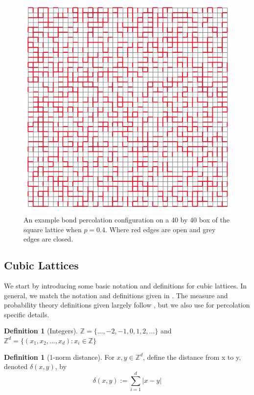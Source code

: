 \documentclass[a4paper,11pt]{article}
\theoremstyle{definition}
\newtheorem{definition}[theorem]{Definition}
\begin{document}
\begin{figure}
	\centering
	\includegraphics[scale=0.7]{drawings/simulationConfig.png}
	\caption{An example bond percolation configuration on a 40 by 40 box of the square lattice when $p=0.4$. Where red edges are open and grey edges are closed.}
	\label{fig:simBox}
\end{figure}
\subsection{Cubic Lattices}

We start by introducing some basic notation and definitions for cubic lattices. In general, we match the notation and definitions given in \cite{steif2011mini}. The measure and probability theory definitions given largely follow \cite{ash2000probability}, but we also use \cite{bollo2006} for percolation specific details.

\begin{definition}[Integers]\label{ints} 
	$\mathbb{Z} = \{...,-2,-1,0,1,2,...\}$ and $\mathbb{Z}^d = \{(x_1,x_2,...,x_d) : x_i \in \mathbb{Z} \}$
\end{definition}

\begin{definition}[1-norm distance]\label{dist}
	For $x,y\in \mathbb{Z}^d$, define the distance from x to y, denoted $\delta(x,y)$, by
	$$\delta(x,y) := \sum_{i=1}^{d}|x-y|$$
\end{definition}\label{lattice} 
\end{document}

